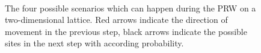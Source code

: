 \begin{figure}[bth]
    \myfloatalign
     \quad
    \\
     \quad
    \caption[\acs{PRW} on a two-dimensional lattice]{The four possible scenarios which can happen during the \acs{PRW} on a two-dimensional lattice. Red arrows indicate the direction of movement in the previous step, black arrows indicate the possible sites in the next step with according probability.}\label{fig:2DPRW}
\end{figure}


